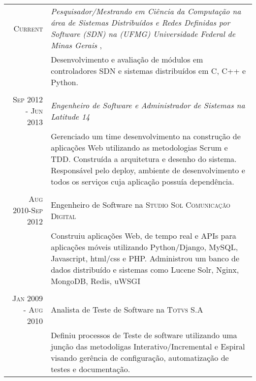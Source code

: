 \documentclass[a4paper,10pt]{article} %
\begin{document}
\begin{tabular}{r|p{11cm}}

\textsc{Current} & \emph{ Pesquisador/Mestrando em Ciência da Computação na
área de Sistemas Distribuídos e Redes Definidas por Software (SDN) 
na (UFMG) Universidade Federal de Minas Gerais }, \\ 
& \footnotesize{Desenvolvimento e avaliação de módulos em controladores SDN
e sistemas distribuídos em C, C++ e Python.} \\
\multicolumn{2}{c}{} \\

\textsc{Sep 2012 - Jun 2013} & \emph{Engenheiro de Software e Administrador 
de Sistemas na Latitude 14} \\ 
& \footnotesize{Gerenciado um time desenvolvimento na construção de 
aplicações Web utilizando as metodologias Scrum e TDD.
Construída a arquitetura e desenho do sistema.
Responsável pelo deploy, ambiente de desenvolvimento e todos 
os serviços cuja aplicação possuía dependência. } \\
\multicolumn{2}{c}{} \\


\textsc{Aug 2010-Sep 2012} & Engenheiro de Software na \textsc{Studio Sol
Comunicação Digital}  \\
& \footnotesize{Construiu aplicações Web, de tempo real e 
APIs para aplicações móveis utilizando Python/Django, MySQL, 
Javascript, html/css e PHP.
Administrou um banco de dados distribuído e sistemas como 
Lucene Solr, Nginx, MongoDB, Redis, uWSGI}\\
\multicolumn{2}{c}{} \\


\textsc{Jan 2009 - Aug 2010} & Analista de Teste de Software
na \textsc{Totvs S.A} \\
& \footnotesize{Definiu processos de Teste de software utilizando uma
junção das metodoligas Interativo/Incremental e Espiral visando 
gerência de configuração, automatização de testes e documentação.}
\end{tabular}




\end{document}
